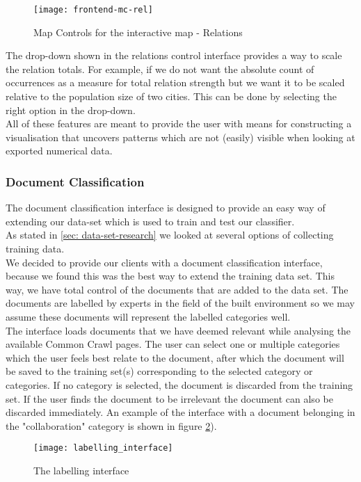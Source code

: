 \begin{figure}[H]
\centering
\texttt{[image: frontend-mc-rel]}
\caption{Map Controls for the interactive map - Relations}
\label{fig:frontend-mc-rel}
\end{figure}

The drop-down shown in the relations control interface provides a way to scale the relation totals. For example, if we do not want the absolute count of occurrences as a measure for total relation strength but we want it to be scaled relative to the population size of two cities. This can be done by selecting the right option in the drop-down.\\
All of these features are meant to provide the user with means for constructing a visualisation that uncovers patterns which are not (easily) visible when looking at exported numerical data.

\subsubsection{Document Classification}
The document classification interface is designed to provide an easy way of extending our data-set which is used to train and test our classifier.\\
As stated in \ref{sec: data-set-research} we looked at several options of collecting training data.\\
We decided to provide our clients with a document classification interface, because  we found this was the best way to extend the training data set. This way, we have total control of the documents that are added to the data set. The documents are labelled by experts in the field of the built environment so we may assume these documents will represent the labelled categories well. \\
The interface loads documents that we have deemed relevant while analysing the available Common Crawl pages. The user can select one or multiple categories which the user feels best relate to the document, after which the document will be saved to the training set(s) corresponding to the selected category or categories. If no category is selected, the document is discarded from the training set. If the user finds the document to be irrelevant the document can also be discarded immediately. An example of the interface with a document belonging in the "collaboration" category is shown in figure \ref{fig:frontend-label}).
\begin{figure}[H]
\centering
\texttt{[image: labelling\_interface]}
\caption{The labelling interface}
\label{fig:frontend-label}
\end{figure}

